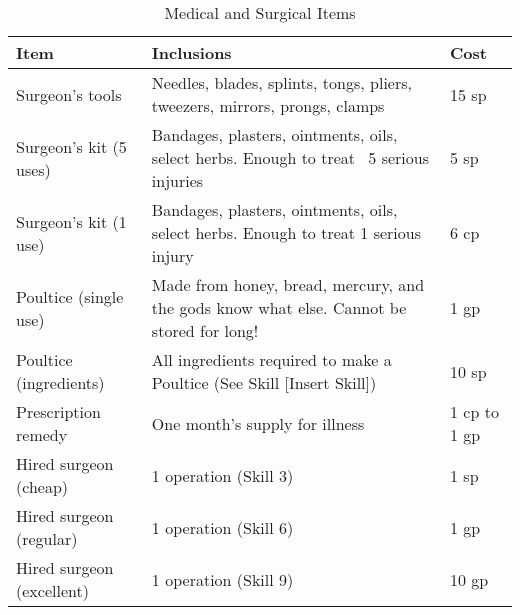 \documentclass[oneside,11pt,english]{book}
\begin{document}
\begin{table}[hb]
  \centering
  \caption{Medical and Surgical Items}
  \label{tab:Medical and Surgical Items}
  \begin{tabu} spread 0pt {*{3}{X[-1]}}
    Item &Inclusions &Cost\\\toprule
    Surgeon’s tools &Needles, blades, splints, tongs, pliers, tweezers, mirrors, prongs, clamps &15 sp\\
    Surgeon’s kit (5 uses) &Bandages, plasters, ointments, oils, select herbs. Enough to treat ~5 serious injuries &5 sp\\
    Surgeon’s kit (1 use) &Bandages, plasters, ointments, oils, select herbs. Enough to treat 1 serious injury &6 cp\\
    Poultice (single use) &Made from honey, bread, mercury, and the gods know what else. Cannot be stored for long! &1 gp\\
    Poultice (ingredients) &All ingredients required to make a Poultice (See Skill [Insert Skill]) &10 sp\\
    Prescription remedy &One month’s supply for illness &1 cp to 1 gp\\
    Hired surgeon (cheap) &1 operation (Skill 3) &1 sp\\
    Hired surgeon (regular) &1 operation (Skill 6) &1 gp\\
    Hired surgeon (excellent) &1 operation (Skill 9) &10 gp\\
  \end{tabu}
\end{table}
\end{document}

